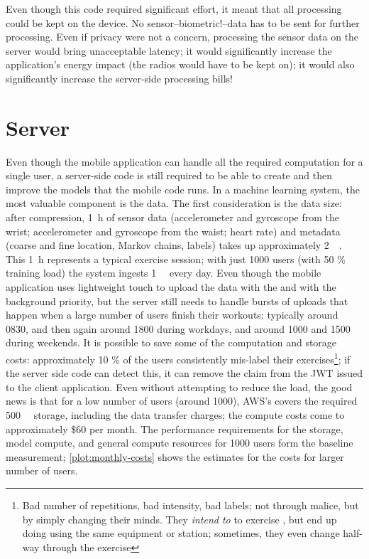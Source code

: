 Even though this code required significant effort, it meant that all processing could be kept on the device. No sensor--biometric!--data has to be sent for further processing. Even if privacy were not a concern, processing the sensor data on the server would bring unacceptable latency; it would significantly increase the application's energy impact (the radios would have to be kept on); it would also significantly increase the server-side processing bills! 

\section{Server}
Even though the mobile application can handle all the required computation for a single user, a server-side code is still required to be able to create and then improve the models that the mobile code runs. In a machine learning system, the most valuable component is the data. The first consideration is the data size: after compression, \SI{1}{\hour} of sensor data (accelerometer and gyroscope from the wrist; accelerometer and gyroscope from the waist; heart rate) and metadata (coarse and fine location, Markov chains, labels) takes up approximately \SI{2}{\mebi\byte}. This \SI{1}{\hour} represents a typical exercise session; with just 1000 users (with 50 \% training load) the system ingests \SI{1}{\gibi\byte} every day. Even though the mobile application uses lightweight touch to upload the data with the  and  with the background priority, but the server still needs to handle bursts of uploads that happen when a large number of users finish their workouts: typically around 0830, and then again around 1800 during workdays, and around 1000 and 1500 during weekends. It is possible to save some of the computation and storage costs: approximately 10 \% of the users consistently mis-label their exercises\footnote{Bad number of repetitions, bad intensity, bad labels; not through malice, but by simply changing their minds. They \emph{intend to} to exercise , but end up doing  using the same equipment or station; sometimes, they even change half-way through the exercise}; if the server side code can detect this, it can remove the  claim from the JWT issued to the client application. Even without attempting to reduce the load, the good news is that for a low number of users (around 1000), AWS's  covers the required \SI{500}{\gibi\byte} storage, including the data transfer charges; the compute costs come to approximately \$60 per month. The performance requirements for the storage, model compute, and general compute resources for 1000 users form the baseline measurement; \autoref{plot:monthly-costs} shows the estimates for the costs for larger number of users. 

